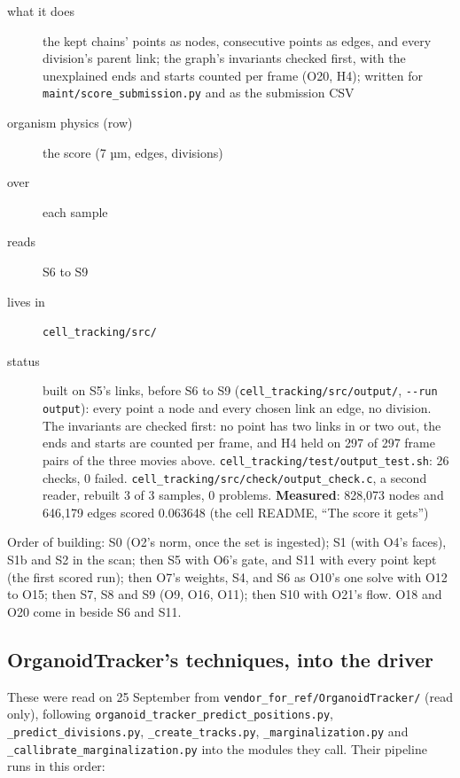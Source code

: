 \begin{description}
\item[{what it does}] the kept chains' points as nodes, consecutive points as edges, and every division's parent link; the graph's invariants checked first, with the unexplained ends and starts counted per frame (O20, H4); written for \texttt{maint/\allowbreak{}score\_\allowbreak{}submission.\allowbreak{}py} and as the submission CSV
\item[{organism physics (row)}] the score (7 µm, edges, divisions)
\item[{over}] each sample
\item[{reads}] S6 to S9
\item[{lives in}] \texttt{cell\_\allowbreak{}tracking/\allowbreak{}src/\allowbreak{}}
\item[{status}] built on S5's links, before S6 to S9 (\texttt{cell\_\allowbreak{}tracking/\allowbreak{}src/\allowbreak{}output/\allowbreak{}}, \texttt{-\allowbreak{}-\allowbreak{}run output}): every point a node and every chosen link an edge, no division. The invariants are checked first: no point has two links in or two out, the ends and starts are counted per frame, and H4 held on 297 of 297 frame pairs of the three movies above. \texttt{cell\_\allowbreak{}tracking/\allowbreak{}test/\allowbreak{}output\_\allowbreak{}test.\allowbreak{}sh}: 26 checks, 0 failed. \texttt{cell\_\allowbreak{}tracking/\allowbreak{}src/\allowbreak{}check/\allowbreak{}output\_\allowbreak{}check.\allowbreak{}c}, a second reader, rebuilt 3 of 3 samples, 0 problems. \textbf{Measured}: 828,073 nodes and 646,179 edges scored 0.063648 (the cell README, “The score it gets”)
\end{description}

Order of building: S0 (O2's norm, once the set is ingested); S1 (with O4's faces), S1b and S2 in the scan; then S5 with O6's gate, and S11 with every point kept (the first scored run); then O7's weights, S4, and S6 as O10's one solve with O12 to O15; then S7, S8 and S9 (O9, O16, O11); then S10 with O21's flow. O18 and O20 come in beside S6 and S11.

\subsection{\texorpdfstring{OrganoidTracker's techniques, into the driver}{OrganoidTracker's techniques, into the driver}}

These were read on 25 September from \texttt{vendor\_\allowbreak{}for\_\allowbreak{}ref/\allowbreak{}Organoid\allowbreak{}Tracker/\allowbreak{}} (read only), following \texttt{organoid\_\allowbreak{}tracker\_\allowbreak{}predict\_\allowbreak{}positions.\allowbreak{}py}, \texttt{\_\allowbreak{}predict\_\allowbreak{}divisions.\allowbreak{}py}, \texttt{\_\allowbreak{}create\_\allowbreak{}tracks.\allowbreak{}py}, \texttt{\_\allowbreak{}marginalization.\allowbreak{}py} and \texttt{\_\allowbreak{}callibrate\_\allowbreak{}marginalization.\allowbreak{}py} into the modules they call. Their pipeline runs in this order:


